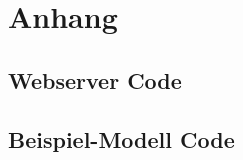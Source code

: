 \section{Anhang}


\subsection{Webserver Code}
\label{code:webserver}


\subsection{Beispiel-Modell Code}
